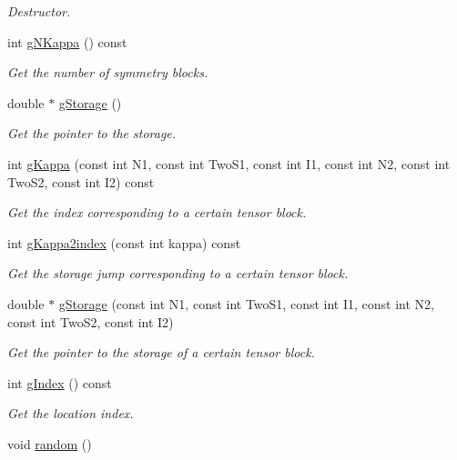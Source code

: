 \begin{DoxyCompactItemize}
\begin{DoxyCompactList}\small\item\em Destructor. \end{DoxyCompactList}\item 
int \hyperlink{classCheMPS2_1_1TensorT_aa842eea97db91466ce8ef14bda6d18ea}{g\-N\-Kappa} () const 
\begin{DoxyCompactList}\small\item\em Get the number of symmetry blocks. \end{DoxyCompactList}\item 
double $\ast$ \hyperlink{classCheMPS2_1_1TensorT_aafb4d43ad6178437b47a32a24c375fa3}{g\-Storage} ()
\begin{DoxyCompactList}\small\item\em Get the pointer to the storage. \end{DoxyCompactList}\item 
int \hyperlink{classCheMPS2_1_1TensorT_a4a3fef6e66cc3210eb674c2d0409ad04}{g\-Kappa} (const int N1, const int Two\-S1, const int I1, const int N2, const int Two\-S2, const int I2) const 
\begin{DoxyCompactList}\small\item\em Get the index corresponding to a certain tensor block. \end{DoxyCompactList}\item 
int \hyperlink{classCheMPS2_1_1TensorT_a55f79851b7dc42a4c288ab82d54d8f1a}{g\-Kappa2index} (const int kappa) const 
\begin{DoxyCompactList}\small\item\em Get the storage jump corresponding to a certain tensor block. \end{DoxyCompactList}\item 
double $\ast$ \hyperlink{classCheMPS2_1_1TensorT_aedead7609c9c66d336d14cdb0fbb5fec}{g\-Storage} (const int N1, const int Two\-S1, const int I1, const int N2, const int Two\-S2, const int I2)
\begin{DoxyCompactList}\small\item\em Get the pointer to the storage of a certain tensor block. \end{DoxyCompactList}\item 
int \hyperlink{classCheMPS2_1_1TensorT_a279b51f0616ab58f2a2893681b4cab71}{g\-Index} () const 
\begin{DoxyCompactList}\small\item\em Get the location index. \end{DoxyCompactList}\item 
\hypertarget{classCheMPS2_1_1TensorT_a5143f02e292c2c7e25d472e75b239298}{void \hyperlink{classCheMPS2_1_1TensorT_a5143f02e292c2c7e25d472e75b239298}{random} ()}\label{classCheMPS2_1_1TensorT_a5143f02e292c2c7e25d472e75b239298}


\end{DoxyCompactItemize}
